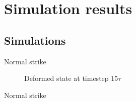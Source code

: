 \documentclass[10pt]{beamer}
\numberwithin{equation}{subsection}
\begin{document}
\section{Simulation results}
\subsection{Simulations}

\begin{frame}{Normal strike}
    \begin{minipage}{0.6\textwidth}
        \begin{figure}\label{norm15tau}
    	\noindent{}
        \caption{Deformed state at timestep $15\tau$}
	\end{figure}
    \end{minipage}
    \hfill
    \begin{minipage}{0.35\textwidth}
    
    \end{minipage}
\end{frame}

\begin{frame}{Normal strike}
\end{frame}
\end{document}
